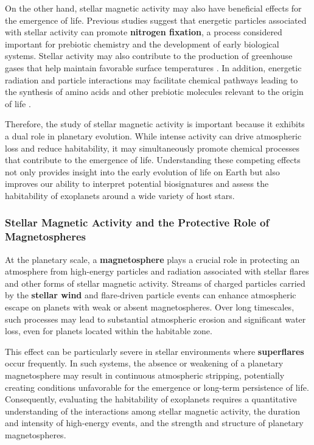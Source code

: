 On the other hand, stellar magnetic activity may also have beneficial effects for the emergence of life. Previous studies suggest that energetic particles associated with stellar activity can promote \textbf{nitrogen fixation}, a process considered important for prebiotic chemistry and the development of early biological systems. Stellar activity may also contribute to the production of greenhouse gases that help maintain favorable surface temperatures \cite{airapetian2016}. In addition, energetic radiation and particle interactions may facilitate chemical pathways leading to the synthesis of amino acids and other prebiotic molecules relevant to the origin of life \cite{kobayashi2023}.

Therefore, the study of stellar magnetic activity is important because it exhibits a dual role in planetary evolution. While intense activity can drive atmospheric loss and reduce habitability, it may simultaneously promote chemical processes that contribute to the emergence of life. Understanding these competing effects not only provides insight into the early evolution of life on Earth but also improves our ability to interpret potential biosignatures and assess the habitability of exoplanets around a wide variety of host stars.

\subsubsection{Stellar Magnetic Activity and the Protective Role of Magnetospheres}

At the planetary scale, a \textbf{magnetosphere} plays a crucial role in protecting an atmosphere from high-energy particles and radiation associated with stellar flares and other forms of stellar magnetic activity. Streams of charged particles carried by the \textbf{stellar wind} and flare-driven particle events can enhance atmospheric escape on planets with weak or absent magnetospheres. Over long timescales, such processes may lead to substantial atmospheric erosion and significant water loss, even for planets located within the habitable zone.

This effect can be particularly severe in stellar environments where \textbf{superflares} occur frequently. In such systems, the absence or weakening of a planetary magnetosphere may result in continuous atmospheric stripping, potentially creating conditions unfavorable for the emergence or long-term persistence of life. Consequently, evaluating the habitability of exoplanets requires a quantitative understanding of the interactions among stellar magnetic activity, the duration and intensity of high-energy events, and the strength and structure of planetary magnetospheres.

